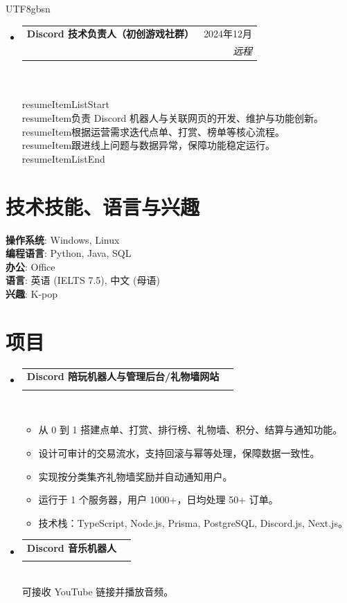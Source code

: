 \documentclass[letterpaper,10pt]{article}
\makeatletter
\newcommand{\resumeItem}[1]{
  \item\small{
    {#1 \vspace{-2pt}}
  }
}
\newcommand{\resumeSubheading}[4]{
  \vspace{-2pt}\item
    \begin{tabular*}{0.97\textwidth}[t]{l@{\extracolsep{\fill}}r}
      \textbf{#1} & #2 \\
      \textit{\small#3} & \textit{\small #4} \\
    \end{tabular*}\vspace{5pt}
}
\newcommand{\resumeSubHeadingListStart}{\begin{itemize}[leftmargin=0.15in, label={}]}
\newcommand{\resumeSubHeadingListEnd}{\end{itemize}}
\newcommand{\resumeItemListStart}{\begin{itemize}}
\newcommand{\resumeItemListEnd}{\end{itemize}\vspace{-5pt}}
\makeatother
\begin{document}
\begin{CJK}{UTF8}{gbsn}
 \resumeSubHeadingListStart
 \resumeSubheading 
      {Discord 技术负责人（初创游戏社群）}{2024年12月}
      {} {远程}\\ 
      \\resumeItemListStart
        \\resumeItem{负责 Discord 机器人与关联网页的开发、维护与功能创新。}
        \\resumeItem{根据运营需求迭代点单、打赏、榜单等核心流程。}
        \\resumeItem{跟进线上问题与数据异常，保障功能稳定运行。}
      \\resumeItemListEnd
  \resumeSubHeadingListEnd



\section{技术技能、语言与兴趣}
 \begin{itemize}[leftmargin=0.15in, label={}]
    \small{\item{
    \textbf{操作系统}{: Windows, Linux} \\
     \textbf{编程语言}{: Python, Java, SQL} \\
     \textbf{办公}{: Office} \\
     \textbf{语言}{: 英语 (IELTS 7.5), 中文 (母语)} \\
     \textbf{兴趣}{: K-pop}
     
    }}
 \end{itemize}

\section{项目}
  \resumeSubHeadingListStart
 \resumeSubheading 
      {Discord 陪玩机器人与管理后台/礼物墙网站}{}
      {} {}\\
      \resumeItemListStart
        \resumeItem{从 0 到 1 搭建点单、打赏、排行榜、礼物墙、积分、结算与通知功能。}
        \resumeItem{设计可审计的交易流水，支持回滚与幂等处理，保障数据一致性。}
        \resumeItem{实现按分类集齐礼物墙奖励并自动通知用户。}
        \resumeItem{运行于 1 个服务器，用户 1000+，日均处理 50+ 订单。}
        \resumeItem{技术栈：TypeScript, Node.js, Prisma, PostgreSQL, Discord.js, Next.js。}
      \resumeItemListEnd
  \resumeSubHeadingListEnd

  \resumeSubHeadingListStart
 \resumeSubheading 
      {Discord 音乐机器人}{}
      {} {}\\ 
      可接收 YouTube 链接并播放音频。\\
      
  \resumeSubHeadingListEnd

\end{CJK}
\end{document}
